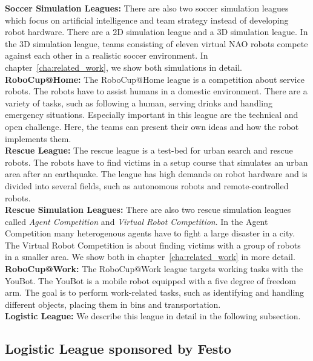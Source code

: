 \textbf{Soccer Simulation Leagues:} There are also two soccer simulation leagues which focus on artificial intelligence and team strategy instead of developing robot hardware. There are a 2D simulation league and a 3D simulation league. In the 3D simulation league, teams consisting of eleven virtual NAO robots compete against each other in a realistic soccer environment. In chapter~\ref{cha:related_work}, we show both simulations in detail.\\
\textbf{RoboCup@Home:} The RoboCup@Home league is a competition about service robots. The robots have to assist humans in a domestic environment. There are a variety of tasks, such as following a human, serving drinks and handling emergency situations. Especially important in this league are the technical and open challenge. Here, the teams can present their own ideas and how the robot implements them.\\
\textbf{Rescue League:} The rescue league is a test-bed for urban search and rescue robots. The robots have to find victims in a setup course that simulates an urban area after an earthquake. The league has high demands on robot hardware and is divided into several fields, such as autonomous robots and remote-controlled robots. \\
\textbf{Rescue Simulation Leagues:} There are also two rescue simulation leagues called \textit{Agent Competition} and \textit{Virtual Robot Competition}. In the Agent Competition many heterogenous agents have to fight a large disaster in a city. The Virtual Robot Competition is about finding victims with a group of robots in a smaller area. We show both in chapter~\ref{cha:related_work} in more detail.\\
\textbf{RoboCup@Work:} The RoboCup@Work league targets working tasks with the YouBot. The YouBot is a mobile robot equipped with a five degree of freedom arm. The goal is to perform work-related tasks, such as identifying and handling different objects, placing them in bins and transportation.\\
\textbf{Logistic League:} We describe this league in detail in the following subsection.\\

\subsection{Logistic League sponsored by Festo}

